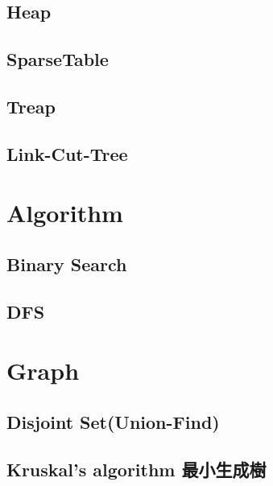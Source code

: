 \subsection{Heap}


\subsection{SparseTable}


\subsection{Treap}


\subsection{Link-Cut-Tree}






\section{Algorithm}

\subsection{Binary Search}


\subsection{DFS}






\section{Graph}

\subsection{Disjoint Set(Union-Find)}


\subsection{Kruskal’s algorithm 最小生成樹}


